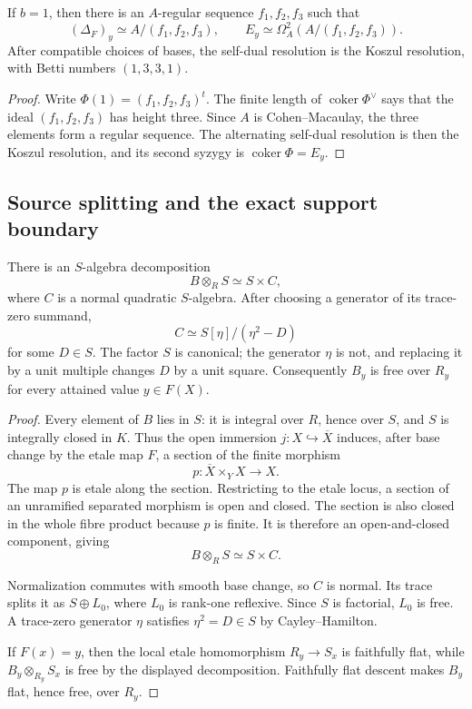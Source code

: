 \begin{corollary}
\label{cor:cubic-one-generator-defect}
If \(b=1\), then there is an \(A\)-regular sequence \(f_1,f_2,f_3\) such that
\[
(\Delta_F)_y\simeq A/(f_1,f_2,f_3),
\qquad
E_y\simeq\Omega_A^2(A/(f_1,f_2,f_3)).
\]
After compatible choices of bases, the self-dual resolution is the Koszul
resolution, with Betti numbers \((1,3,3,1)\).
\end{corollary}

\begin{proof}
Write \(\Phi(1)=(f_1,f_2,f_3)^t\).  The finite length of
\(\operatorname{coker}\Phi^\vee\) says that the ideal
\((f_1,f_2,f_3)\) has height three.  Since \(A\) is Cohen--Macaulay, the three
elements form a regular sequence.  The alternating self-dual resolution is
then the Koszul resolution, and its second syzygy is
\(\operatorname{coker}\Phi=E_y\).
\end{proof}

\subsection{Source splitting and the exact support boundary}

\begin{proposition}
\label{prop:cubic-source-splitting}
There is an \(S\)-algebra decomposition
\[
B\otimes_RS\simeq S\times C,
\]
where \(C\) is a normal quadratic \(S\)-algebra.  After choosing a generator
of its trace-zero summand,
\[
C\simeq S[\eta]/(\eta^2-D)
\]
for some \(D\in S\).  The factor \(S\) is canonical; the generator \(\eta\)
is not, and replacing it by a unit multiple changes \(D\) by a unit square.
Consequently \(B_y\) is free over \(R_y\) for every attained value
\(y\in F(X)\).
\end{proposition}

\begin{proof}
Every element of \(B\) lies in \(S\): it is integral over \(R\), hence over
\(S\), and \(S\) is integrally closed in \(K\).  Thus the open immersion
\(j\colon X\hookrightarrow\overline X\) induces, after base change by the
etale map \(F\), a section of the finite morphism
\[
p\colon\overline X\times_YX\longrightarrow X.
\]
The map \(p\) is etale along the section.  Restricting to the etale locus, a
section of an unramified separated morphism is open and closed.  The section
is also closed in the whole fibre product because \(p\) is finite.  It is
therefore an open-and-closed component, giving
\[
B\otimes_RS\simeq S\times C.
\]

Normalization commutes with smooth base change, so \(C\) is normal.  Its
trace splits it as \(S\oplus L_0\), where \(L_0\) is rank-one reflexive.
Since \(S\) is factorial, \(L_0\) is free.  A trace-zero generator \(\eta\)
satisfies \(\eta^2=D\in S\) by Cayley--Hamilton.

If \(F(x)=y\), then the local etale homomorphism \(R_y\to S_x\) is faithfully
flat, while \(B_y\otimes_{R_y}S_x\) is free by the displayed decomposition.
Faithfully flat descent makes \(B_y\) flat, hence free, over \(R_y\).
\end{proof}

